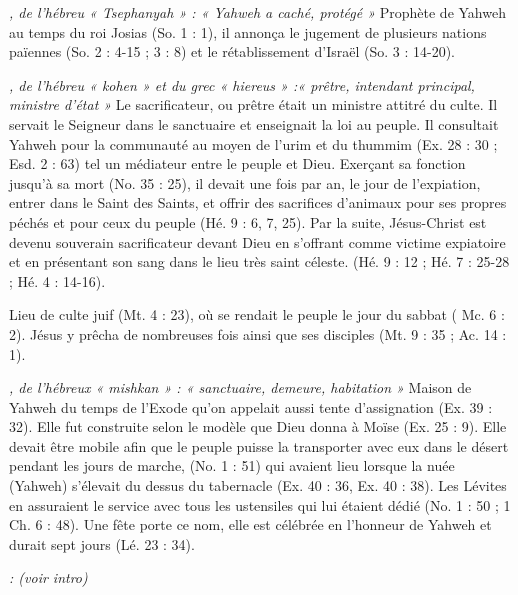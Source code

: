 \begin{multicols}{2}
\textit{, de l'hébreu « Tsephanyah » : « Yahweh a caché, protégé »}\newline
Prophète de Yahweh au temps du roi Josias (So. 1 : 1), il annonça le jugement de plusieurs nations païennes (So. 2 : 4-15 ; 3 : 8) et le rétablissement d'Israël (So. 3 : 14-20).

\textit{, de l'hébreu « kohen » et du grec « hiereus » :« prêtre, intendant principal, ministre d'état »}\newline
Le sacrificateur, ou prêtre était un ministre attitré du culte. Il servait le Seigneur dans le sanctuaire et enseignait la loi au peuple. Il consultait Yahweh pour la communauté au moyen de l'urim et du thummim (Ex. 28 : 30 ; Esd. 2 : 63) tel un médiateur entre le peuple et Dieu. Exerçant sa fonction jusqu'à sa mort (No. 35 : 25), il devait une fois par an, le jour de l'expiation, entrer dans le Saint des Saints, et offrir des sacrifices d'animaux pour ses propres péchés et pour ceux du peuple (Hé. 9 : 6, 7, 25). Par la suite, Jésus-Christ est devenu souverain sacrificateur devant Dieu en s'offrant comme victime expiatoire et en présentant son sang dans le lieu très saint céleste. (Hé. 9 : 12 ; Hé. 7 : 25-28 ; Hé. 4 : 14-16).

\textit{}\newline
Lieu de culte juif (Mt. 4 : 23), où se rendait le peuple le jour du sabbat ( Mc. 6 : 2). Jésus y prêcha de nombreuses fois ainsi que ses disciples (Mt. 9 : 35 ; Ac. 14 : 1).

\textit{, de l'hébreux « mishkan » : « sanctuaire, demeure, habitation »}\newline
Maison de Yahweh du temps de l'Exode qu'on appelait aussi tente d'assignation (Ex. 39 : 32). Elle fut construite selon le modèle que Dieu donna à Moïse (Ex. 25 : 9). Elle devait être mobile afin que le peuple puisse la transporter avec eux dans le désert pendant les jours de marche, (No. 1 : 51) qui avaient lieu lorsque la nuée (Yahweh) s'élevait du dessus du tabernacle (Ex. 40 : 36, Ex. 40 : 38). Les Lévites en assuraient le service avec tous les ustensiles qui lui étaient dédié (No. 1 : 50 ; 1 Ch. 6 : 48). Une fête porte ce nom, elle est célébrée en l'honneur de Yahweh et durait sept jours (Lé. 23 : 34).

\textit{: (voir intro)}\newline


\end{multicols}
